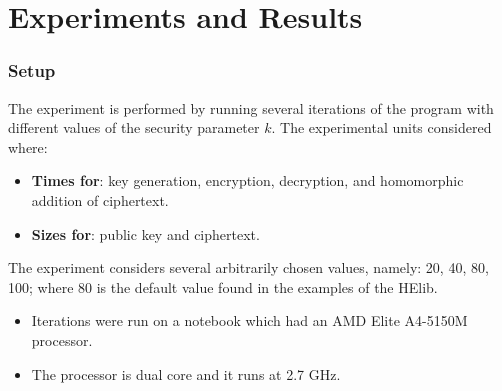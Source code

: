 \documentclass{beamer}
\begin{document}
\begin{frame}
\begin{table}[]
\centering
{}
\end{table}
\end{frame}
\section{Experiments and Results}
\begin{frame}
\frametitle{Setup}
The experiment is performed by running several iterations of the program with different values of the security parameter $k$. The experimental units considered where: 
\begin{itemize}
\item \textbf{Times for}: key generation, encryption, decryption, and homomorphic addition of ciphertext. 
\item \textbf{Sizes for}: public key and ciphertext.
\end{itemize}

\vspace*{5mm} 
The experiment considers several arbitrarily chosen values, namely: 20, 40, 80, 100; where 80 is the default value found in the examples of the HElib.

\begin{itemize}
\item Iterations were run on a notebook which had an AMD Elite A4-5150M processor. 
\item The processor is dual core and it runs at 2.7 GHz. 
\end{itemize}
\end{frame}
\end{document}
